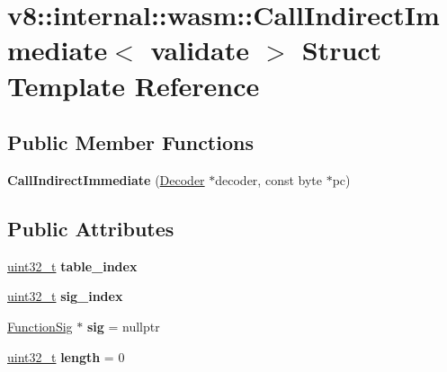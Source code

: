 \hypertarget{structv8_1_1internal_1_1wasm_1_1CallIndirectImmediate}{}\section{v8\+:\+:internal\+:\+:wasm\+:\+:Call\+Indirect\+Immediate$<$ validate $>$ Struct Template Reference}
\label{structv8_1_1internal_1_1wasm_1_1CallIndirectImmediate}
\subsection*{Public Member Functions}
\begin{DoxyCompactItemize}
\item 
\mbox{\label{structv8_1_1internal_1_1wasm_1_1CallIndirectImmediate_af211f9836f27c37949789d6314a10cd9}} 
{\bfseries Call\+Indirect\+Immediate} (\mbox{\hyperlink{classv8_1_1internal_1_1wasm_1_1Decoder}{Decoder}} $\ast$decoder, const byte $\ast$pc)
\end{DoxyCompactItemize}
\subsection*{Public Attributes}
\begin{DoxyCompactItemize}
\item 
\mbox{\label{structv8_1_1internal_1_1wasm_1_1CallIndirectImmediate_a3ceaf720b84872e0f83476967339643a}} 
\mbox{\hyperlink{classuint32__t}{uint32\+\_\+t}} {\bfseries table\+\_\+index}
\item 
\mbox{\label{structv8_1_1internal_1_1wasm_1_1CallIndirectImmediate_a6a5b7f67a2d0a8b47305de3036b4b9a8}} 
\mbox{\hyperlink{classuint32__t}{uint32\+\_\+t}} {\bfseries sig\+\_\+index}
\item 
\mbox{\label{structv8_1_1internal_1_1wasm_1_1CallIndirectImmediate_a9794f6e422bd73aed5329b3bcfdf552b}} 
\mbox{\hyperlink{classv8_1_1internal_1_1Signature}{Function\+Sig}} $\ast$ {\bfseries sig} = nullptr
\item 
\mbox{\label{structv8_1_1internal_1_1wasm_1_1CallIndirectImmediate_acd0d0f36342642f0fa5b7b63aa57cdd7}} 
\mbox{\hyperlink{classuint32__t}{uint32\+\_\+t}} {\bfseries length} = 0
\end{DoxyCompactItemize}


